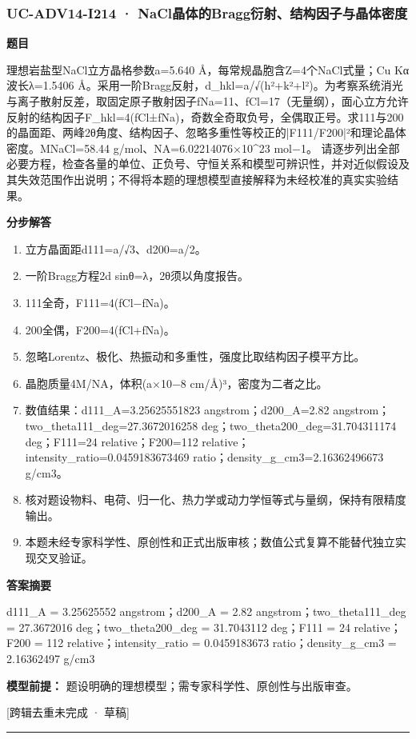\documentclass[UTF8,11pt,a4paper]{ctexart}
\begin{document}
\subsubsection*{UC-ADV14-I214 · NaCl晶体的Bragg衍射、结构因子与晶体密度}
\noindent\textbf{题目}\par
理想岩盐型NaCl立方晶格参数a=5.640 Å，每常规晶胞含Z=4个NaCl式量；Cu Kα波长λ=1.5406 Å。采用一阶Bragg反射，d\_hkl=a/√(h²+k²+l²)。为考察系统消光与离子散射反差，取固定原子散射因子fNa=11、fCl=17（无量纲），面心立方允许反射的结构因子F\_hkl=4(fCl±fNa)，奇数全奇取负号，全偶取正号。求111与200的晶面距、两峰2θ角度、结构因子、忽略多重性等校正的|F111/F200|²和理论晶体密度。MNaCl=58.44 g/mol、NA=6.02214076×10\textasciicircum{}23 mol−1。 请逐步列出全部必要方程，检查各量的单位、正负号、守恒关系和模型可辨识性，并对近似假设及其失效范围作出说明；不得将本题的理想模型直接解释为未经校准的真实实验结果。\par
\medskip\noindent\textbf{分步解答}
\begin{enumerate}
\item 立方晶面距d111=a/√3、d200=a/2。
\item 一阶Bragg方程2d sinθ=λ，2θ须以角度报告。
\item 111全奇，F111=4(fCl−fNa)。
\item 200全偶，F200=4(fCl+fNa)。
\item 忽略Lorentz、极化、热振动和多重性，强度比取结构因子模平方比。
\item 晶胞质量4M/NA，体积(a×10−8 cm/Å)³，密度为二者之比。
\item 数值结果：d111\_A=3.25625551823 angstrom；d200\_A=2.82 angstrom；two\_theta111\_deg=27.3672016258 deg；two\_theta200\_deg=31.704311174 deg；F111=24 relative；F200=112 relative；intensity\_ratio=0.0459183673469 ratio；density\_g\_cm3=2.16362496673 g/cm3。
\item 核对题设物料、电荷、归一化、热力学或动力学恒等式与量纲，保持有限精度输出。
\item 本题未经专家科学性、原创性和正式出版审核；数值公式复算不能替代独立实现交叉验证。
\end{enumerate}
\noindent\textbf{答案摘要}\par
d111\_A = 3.25625552 angstrom；d200\_A = 2.82 angstrom；two\_theta111\_deg = 27.3672016 deg；two\_theta200\_deg = 31.7043112 deg；F111 = 24 relative；F200 = 112 relative；intensity\_ratio = 0.0459183673 ratio；density\_g\_cm3 = 2.16362497 g/cm3\par
\noindent\textbf{模型前提：}
题设明确的理想模型；需专家科学性、原创性与出版审查。\par
\noindent\textcolor{red!65!black}{[跨辑去重未完成 · 草稿]} \par
\medskip\hrule\medskip
{}
\end{document}
